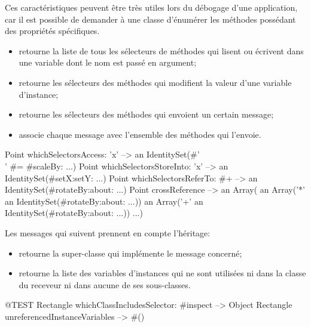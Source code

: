 \documentclass[a4paper,10pt,twoside]{book}
\begin{document}
Ces caractéristiques peuvent être très utiles lors du débogage d'une application, car il est possible de demander à une classe d'énumérer les méthodes possédant des propriétés spécifiques.
\begin{itemize}
\item {} retourne la liste de tous les sélecteurs de méthodes qui lisent ou écrivent dans une variable dont le nom est passé en argument;
\item {} retourne les sélecteurs des méthodes qui modifient la valeur d'une variable d'instance;
\item {} retourne les sélecteurs des méthodes qui envoient un certain message;
\item {} associe chaque message avec l'ensemble des méthodes qui l'envoie.
\end{itemize}

\begin{code}{} %
Point whichSelectorsAccess: 'x'    --> an IdentitySet(#'\\' #= #scaleBy: ...)
Point whichSelectorsStoreInto: 'x' --> an IdentitySet(#setX:setY: ...)
Point whichSelectorsReferTo: #+  --> an IdentitySet(#rotateBy:about: ...)
Point crossReference --> an Array(
		an Array('*' an IdentitySet(#rotateBy:about: ...))
		an Array('+' an IdentitySet(#rotateBy:about: ...))
		...)
\end{code}

Les messages qui suivent prennent en compte l'héritage:
\begin{itemize}
\item {} retourne la super-classe qui implémente le message concerné;
\item {} retourne la liste des variables d'instances qui ne sont utilisées ni dans la classe du receveur ni dans aucune de ses sous-classes.
\end{itemize}

\begin{code}{@TEST}
Rectangle whichClassIncludesSelector: #inspect --> Object
Rectangle unreferencedInstanceVariables            --> #()
\end{code}

\end{document}
